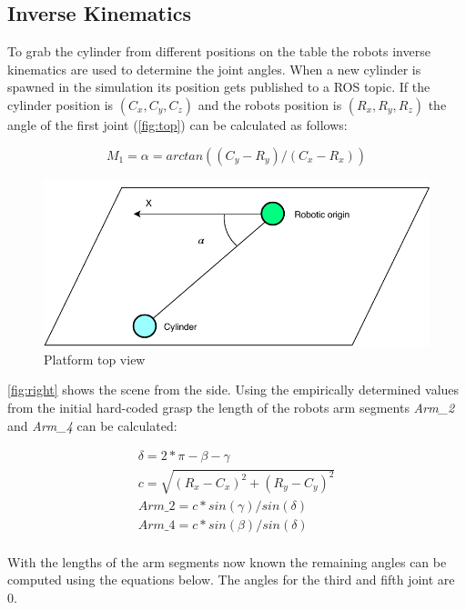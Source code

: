 \subsection{Inverse Kinematics}
To grab the cylinder from different positions on the table the robots inverse kinematics are used to determine the joint angles.
When a new cylinder is spawned in the simulation its position gets published to a ROS topic.
If the cylinder position is $(C_x, C_y, C_z)$ and the robots position is $(R_x, R_y, R_z)$ the angle of the first joint (\autoref{fig:top}) can be calculated as follows:

\begin{equation}
\label{simple_equation}
M_1=\alpha = arctan((C_y-R_y)/(C_x-R_x))
\end{equation}

\begin{figure}[htpb]
\centering
	\includegraphics[width=0.96\linewidth]{figures/top_view.pdf} 
	\caption{Platform top view}
	\vspace{-0.4cm}
	\label{fig:top}
\end{figure}


\autoref{fig:right} shows the scene from the side.
Using the empirically determined values from the initial hard-coded grasp the length of the robots arm segments \textit{Arm\_2} and \textit{Arm\_4} can be calculated:

\begin{equation}
\begin{aligned}
\delta=2*\pi-\beta-\gamma\\
c=\sqrt{(R_x-C_x)^2+(R_y-C_y)^2}\\
\textit{Arm\_2}=c*sin(\gamma)/sin(\delta)\\
\textit{Arm\_4}=c*sin(\beta)/sin(\delta)\\
\end{aligned}
\end{equation}

With the lengths of the arm segments now known the remaining angles can be computed using the equations below.
The angles for the third and fifth joint are 0.

